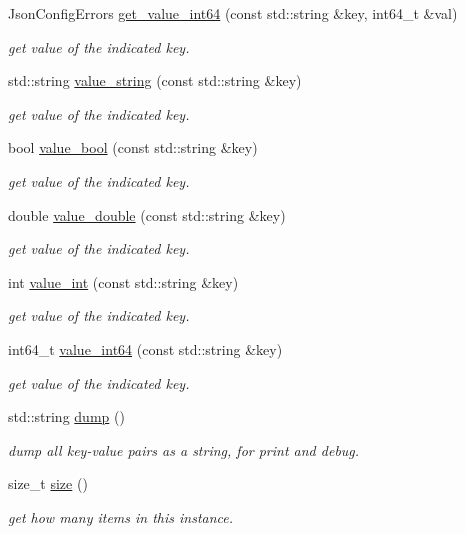 \begin{DoxyCompactItemize}
Json\-Config\-Errors \hyperlink{classJsonConfig_a13cb996e75a83b3f11c32e2f276c3efd}{get\-\_\-value\-\_\-int64} (const std\-::string \&key, int64\-\_\-t \&val)
\begin{DoxyCompactList}\small\item\em get value of the indicated key. \end{DoxyCompactList}\item 
std\-::string \hyperlink{classJsonConfig_a27d69307715ae3e63d61ea65b75f22e2}{value\-\_\-string} (const std\-::string \&key)
\begin{DoxyCompactList}\small\item\em get value of the indicated key. \end{DoxyCompactList}\item 
bool \hyperlink{classJsonConfig_a59dfae74e9899bd9d8f23a36ea2e39b3}{value\-\_\-bool} (const std\-::string \&key)
\begin{DoxyCompactList}\small\item\em get value of the indicated key. \end{DoxyCompactList}\item 
double \hyperlink{classJsonConfig_a36831c9ff4c2f76994875cb64d1c0bae}{value\-\_\-double} (const std\-::string \&key)
\begin{DoxyCompactList}\small\item\em get value of the indicated key. \end{DoxyCompactList}\item 
int \hyperlink{classJsonConfig_ad436a313289e89dbd77f8f934574dd3d}{value\-\_\-int} (const std\-::string \&key)
\begin{DoxyCompactList}\small\item\em get value of the indicated key. \end{DoxyCompactList}\item 
int64\-\_\-t \hyperlink{classJsonConfig_a3c90c715906dfa95fb27a2089e6414f5}{value\-\_\-int64} (const std\-::string \&key)
\begin{DoxyCompactList}\small\item\em get value of the indicated key. \end{DoxyCompactList}\item 
std\-::string \hyperlink{classJsonConfig_aa1ea2ffc00e8535fb37055790a86bf88}{dump} ()
\begin{DoxyCompactList}\small\item\em dump all key-\/value pairs as a string, for print and debug. \end{DoxyCompactList}\item 
size\-\_\-t \hyperlink{classJsonConfig_ad941c321f34696e1b7e5e48f37d27164}{size} ()
\begin{DoxyCompactList}\small\item\em get how many items in this instance. \end{DoxyCompactList}\end{DoxyCompactItemize}


